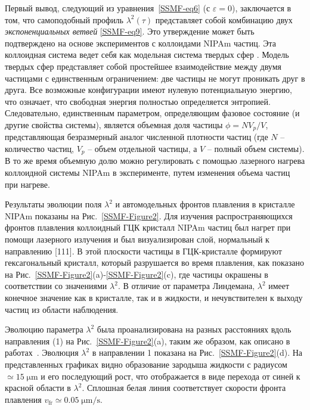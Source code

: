 
Первый вывод, следующий из уравнения~\eqref{SSMF-eq6} (с $ \varepsilon = 0 $), заключается в том, что самоподобный профиль $\lambda^2(\tau) $ представляет собой комбинацию двух \emph{экспоненциальных ветвей} \eqref{SSMF-eq9}.
Это утверждение может быть подтверждено на основе экспериментов с коллоидами NIPAm частиц.
Эта коллоидная система ведет себя как модельная система твердых сфер \cite{10.1126/science.1224763, 10.1038/ncomms7942}.
Модель твердых сфер представляет собой простейшее взаимодействие между двумя частицами с единственным ограничением: две частицы не могут проникать друг в друга.
Все возможные конфигурации имеют нулевую потенциальную энергию, что означает, что свободная энергия полностью определяется энтропией.
Следовательно, единственным параметром, определяющим фазовое состояние (и другие свойства системы), является объемная доля частицы $ \phi = N V_p / V $, представляющая безразмерный аналог численной плотности частиц (где $ N $ -- количество частиц, $ V_p $ -- объем отдельной частицы, а $ V $ -- полный объем системы).
В то же время объемную долю можно регулировать с помощью лазерного нагрева коллоидной системы NIPAm в эксперименте, путем изменения объема частиц при нагреве.

Результаты эволюции поля $\lambda^2$ и автомодельных фронтов плавления в кристалле NIPAm показаны на Рис.~\ref{SSMF-Figure2}.
Для изучения распространяющихся фронтов плавления коллоидный ГЦК кристалл NIPAm частиц был нагрет при помощи лазерного излучения и был визуализирован слой, нормальный к направлению [111].
В этой плоскости частицы в ГЦК-кристалле формируют гексагональный кристалл, который разрушается во время плавления, как показано на Рис.~\ref{SSMF-Figure2}(a)-\ref{SSMF-Figure2}(c), где частицы окрашены в соответствии со значениями $ \lambda^2$.
В отличие от параметра Линдемана, $\lambda^2$ имеет конечное значение как в кристалле, так и в жидкости, и нечувствителен к выходу частиц из области наблюдения.

Эволюцию параметра $\lambda^2$ была проанализирована на разных расстояниях вдоль направления (1) на Рис.~\ref{SSMF-Figure2}(a), таким же образом, как описано в работах~\cite{10.1103/physreve.96.043201, 10.1103/physreve.100.023203}.
Эволюция $\lambda^2$ в направлении 1 показана на Рис.~\ref{SSMF-Figure2}(d).
На представленных графиках видно образование зародыша жидкости с радиусом $\simeq 15\;\mathrm{\mu m}$ и его последующий рост, что отображается в виде перехода от синей к красной области в $\lambda^2$.
Сплошная белая линия соответствует скорости фронта плавления $v_{\mathrm{fr}}\simeq 0.05 \;\mathrm{\mu m /s}$.

